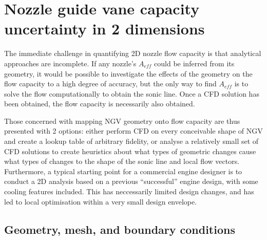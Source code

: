 \documentclass[a4paper, 11pt, oneside]{report}
\begin{document}
\section{Nozzle guide vane capacity uncertainty in 2 dimensions}
\label{section_1d_vs_2d_capacity_uncertainty}

The immediate challenge in quantifying 2D nozzle flow capacity is that analytical approaches are incomplete. If any nozzle's $A_{eff}$ could be inferred from its geometry, it would be possible to investigate the effects of the geometry on the flow capacity to a high degree of accuracy, but the only way to find $A_{eff}$ is to solve the flow computationally to obtain the sonic line. Once a CFD solution has been obtained, the flow capacity is necessarily also obtained. 

Those concerned with mapping NGV geometry onto flow capacity are thus presented with 2 options: either perform CFD on every conceivable shape of NGV and create a lookup table of arbitrary fidelity, or analyse a relatively small set of CFD solutions to create heuristics about what types of geometric changes cause what types of changes to the shape of the sonic line and local flow vectors. Furthermore, a typical starting point for a commercial engine designer is to conduct a 2D analysis based on a previous ``successful'' engine design, with some cooling features included. This has neccessarily limited design changes, and has led to local optimisation within a very small design envelope.

\subsection{Geometry, mesh, and boundary conditions}
\end{document}

